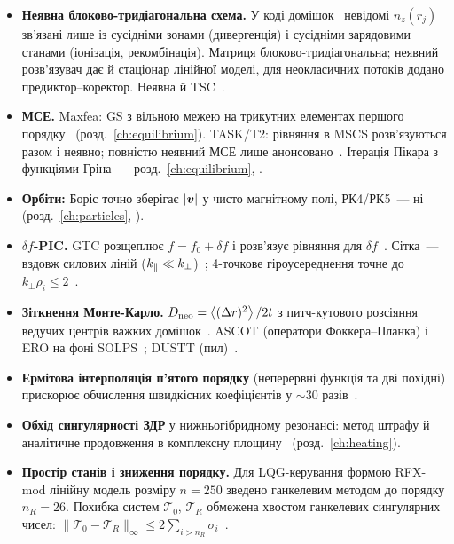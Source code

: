 \begin{itemize}[leftmargin=*]
\item \textbf{Неявна блоково-тридіагональна схема.} У коді домішок~\cite[с.~8]{Hulse1992} невідомі $n_z(r_j)$ зв'язані лише із сусідніми зонами (дивергенція) і сусідніми зарядовими станами (іонізація, рекомбінація). Матриця блоково-тридіагональна; неявний розв'язувач дає й стаціонар лінійної моделі, для неокласичних потоків додано предиктор--коректор. Неявна й TSC~\cite[с.~3]{Jardin2000}.
\item \textbf{МСЕ.} Maxfea: GS з вільною межею на трикутних елементах першого порядку~\cite[с.~31--32]{Merlo2011} (розд.~\ref{ch:equilibrium}). TASK/T2: рівняння в MSCS розв'язуються разом і неявно; повністю неявний МСЕ лише анонсовано~\cite[с.~8--9]{Seto2014}. Ітерація Пікара з функціями Гріна~--- розд.~\ref{ch:equilibrium}, \cite{ProjGSsolver}.
\item \textbf{Орбіти:} Боріс точно зберігає $|\bm{v}|$ у чисто магнітному полі, РК4/РК5~--- ні (розд.~\ref{ch:particles}, \cite{vanVugt2019,Moskvitina2010}).
\item \textbf{$\delta f$-PIC.} GTC розщеплює $f=f_0+\delta f$ і розв'язує рівняння для $\delta f$~\cite[с.~10]{Wang2006}. Сітка~--- вздовж силових ліній ($k_{\parallel}\ll k_\perp$)~\cite[с.~6]{Wang2006}; 4-точкове гіроусереднення точне до $k_\perp\rho_i\le2$~\cite[с.~9--10]{Wang2006}.
\item \textbf{Зіткнення Монте-Карло.} $D_{\mathrm{neo}}=\left\langle (\Delta r)^2 \right\rangle/2t$ з питч-кутового розсіяння ведучих центрів важких домішок~\cite[с.~6]{Wong1987}. ASCOT (оператори Фоккера--Планка) і ERO на фоні SOLPS~\cite[с.~52--53]{AhoMantila2011}; DUSTT (пил)~\cite[с.~5]{Pigarov2006}.
\item \textbf{Ермітова інтерполяція п'ятого порядку} (неперервні функція та дві похідні) прискорює обчислення швидкісних коефіцієнтів у ${\sim}30$ разів~\cite[с.~35]{Marchuk2025}.
\item \textbf{Обхід сингулярності ЗДР} у нижньогібридному резонансі: метод штрафу й аналітичне продовження в комплексну площину~\cite[с.~50--51]{Marchuk2025} (розд.~\ref{ch:heating}).
\item \textbf{Простір станів і зниження порядку.} Для LQG-керування формою RFX-mod лінійну модель розміру $n=250$ зведено ганкелевим методом до порядку $n_R=26$. Похибка систем $\mathcal T_0$, $\mathcal T_R$ обмежена хвостом ганкелевих сингулярних чисел: $\|\mathcal T_0-\mathcal T_R\|_\infty\le2\sum_{i>n_R}\sigma_i$~\cite[с.~97, 101]{Merlo2011}.
\end{itemize}

